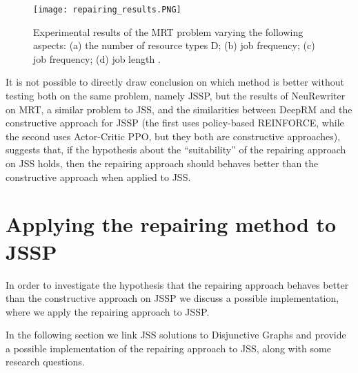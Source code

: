 \documentclass[12pt]{article}
\begin{document}
\begin{figure}[H]
    \centering
    \texttt{[image: repairing\_results.PNG]}
    \caption{Experimental results of the MRT problem varying the following aspects: (a) the number of resource types D; (b) job frequency; (c) job frequency; (d) job length \cite{neu_rewriter}.}
    \label{img:repairing_results}
\end{figure}

It is not possible to directly draw conclusion on which method is better without testing both on the same problem, namely JSSP, but the results of NeuRewriter on MRT, a similar problem to JSS, 
and the similarities between DeepRM and the constructive approach for JSSP (the first uses policy-based REINFORCE, while the second uses Actor-Critic PPO, but they both are constructive approaches), suggests that, if 
the hypothesis about the ``suitability'' of the repairing approach on JSS holds, then the repairing approach should behaves better than the constructive approach when applied to JSS.

\medbreak
\section{Applying the repairing method to JSSP}
\label{sec:jssp_repairing}
In order to investigate the hypothesis that the repairing approach behaves better than the constructive approach on JSSP we discuss a possible implementation, where we apply the repairing approach to JSSP.

\medbreak
In the following section we link JSS solutions to Disjunctive Graphs and provide a possible implementation of the repairing approach to JSS, along with some research questions.

\medbreak
\end{document}
